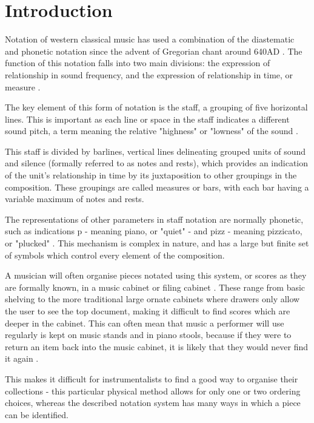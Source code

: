 \section{Introduction}
Notation of western classical music has used a combination of the diastematic and phonetic notation \parencite{RRastall} since the advent of Gregorian chant around 640AD \parencite{RTaruskin}. The function of this notation falls into two main divisions: the expression of relationship in sound frequency, and the expression of relationship in time, or measure \parencite{oxHistory}.

The key element of this form of notation is the staff, a grouping of five horizontal lines. This is important as each line or space in the staff indicates a different sound pitch, a term meaning the relative "highness" or "lowness" of the sound \parencite{classroom}.

This staff is divided by barlines, vertical lines delineating grouped units of sound and silence (formally referred to as notes and rests), which provides an indication of the unit's relationship in time by its juxtaposition to other groupings in the composition. These groupings are called measures or bars, with each bar having a variable maximum of notes and rests. 

The representations of other parameters in staff notation are normally phonetic, such as indications p - meaning piano, or "quiet" - and pizz - meaning pizzicato, or "plucked" \parencite{RRastall}. This mechanism is complex in nature, and has a large but finite set of symbols which control every element of the composition.

A musician will often organise pieces notated using this system, or scores as they are formally known, in a music cabinet or filing cabinet \parencite{musicOrganising}. These range from basic shelving to the more traditional large ornate cabinets where drawers only allow the user to see the top document, making it difficult to find scores which are deeper in the cabinet. This can often mean that music a performer will use regularly is kept on music stands and in piano stools, because if they were to return an item back into the music cabinet, it is likely that they would never find it again \parencite{SheetMusicRant}.

This makes it difficult for instrumentalists to find a good way to organise their collections - this particular physical method allows for only one or two ordering choices, whereas the described notation system has many ways in which a piece can be identified. 

